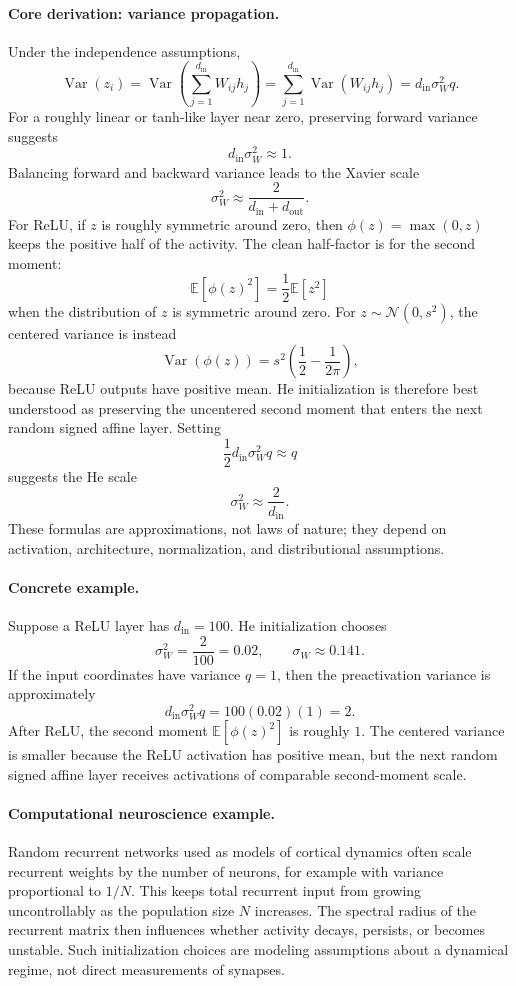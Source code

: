 \paragraph{Core derivation: variance propagation.}
Under the independence assumptions,
\[
\operatorname{Var}(z_i)
=\operatorname{Var}\left(\sum_{j=1}^{d_{\mathrm{in}}}W_{ij}h_j\right)
=\sum_{j=1}^{d_{\mathrm{in}}}\operatorname{Var}(W_{ij}h_j)
=d_{\mathrm{in}}\sigma_W^2 q.
\]
For a roughly linear or tanh-like layer near zero, preserving forward variance suggests
\[
d_{\mathrm{in}}\sigma_W^2\approx 1.
\]
Balancing forward and backward variance leads to the Xavier scale
\[
\sigma_W^2\approx \frac{2}{d_{\mathrm{in}}+d_{\mathrm{out}}}.
\]
For ReLU, if \(z\) is roughly symmetric around zero, then \(\phi(z)=\max(0,z)\) keeps the positive half of the activity. The clean half-factor is for the second moment:
\[
\mathbb{E}[\phi(z)^2]=\frac12\mathbb{E}[z^2]
\]
when the distribution of \(z\) is symmetric around zero. For \(z\sim\mathcal{N}(0,s^2)\), the centered variance is instead
\[
\operatorname{Var}(\phi(z))=s^2\left(\frac12-\frac{1}{2\pi}\right),
\]
because ReLU outputs have positive mean. He initialization is therefore best understood as preserving the uncentered second moment that enters the next random signed affine layer. Setting
\[
\frac12 d_{\mathrm{in}}\sigma_W^2 q\approx q
\]
suggests the He scale
\[
\boxed{\sigma_W^2\approx \frac{2}{d_{\mathrm{in}}}.}
\]
These formulas are approximations, not laws of nature; they depend on activation, architecture, normalization, and distributional assumptions.

\paragraph{Concrete example.}
Suppose a ReLU layer has \(d_{\mathrm{in}}=100\). He initialization chooses
\[
\sigma_W^2=\frac{2}{100}=0.02,\qquad \sigma_W\approx 0.141.
\]
If the input coordinates have variance \(q=1\), then the preactivation variance is approximately
\[
d_{\mathrm{in}}\sigma_W^2 q=100(0.02)(1)=2.
\]
After ReLU, the second moment \(\mathbb{E}[\phi(z)^2]\) is roughly \(1\). The centered variance is smaller because the ReLU activation has positive mean, but the next random signed affine layer receives activations of comparable second-moment scale.

\paragraph{Computational neuroscience example.}
Random recurrent networks used as models of cortical dynamics often scale recurrent weights by the number of neurons, for example with variance proportional to \(1/N\). This keeps total recurrent input from growing uncontrollably as the population size \(N\) increases. The spectral radius of the recurrent matrix then influences whether activity decays, persists, or becomes unstable. Such initialization choices are modeling assumptions about a dynamical regime, not direct measurements of synapses.

